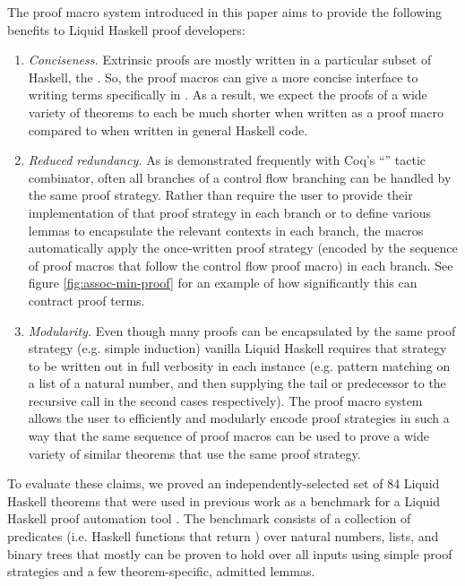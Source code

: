 The proof macro system introduced in this paper aims to provide the following
benefits to Liquid Haskell proof developers:
\begin{enumerate}
  \item \textit{Conciseness.} Extrinsic proofs are mostly written in a
  particular subset of Haskell, the \LangB. So, the proof macros can give a more
  concise interface to writing terms specifically in \LangB. As a result, we
  expect the proofs of a wide variety of theorems to each be much shorter when
  written as a proof macro compared to when written in general Haskell code.
  \item \textit{Reduced redundancy.} As is demonstrated frequently with Coq's
  ``\LC{;}'' tactic combinator, often all branches of a control flow branching
  can be handled by the same proof strategy. Rather than require the user to
  provide their implementation of that proof strategy in each branch or to
  define various lemmas to encapsulate the relevant contexts in each branch, the
  macros automatically apply the once-written proof strategy (encoded by the
  sequence of proof macros that follow the control flow proof macro) in each
  branch. See figure \ref{fig:assoc-min-proof} for an example of how
  significantly this can contract proof terms.
  \item \textit{Modularity.} Even though many proofs can be encapsulated by the
  same proof strategy (e.g. simple induction) vanilla Liquid Haskell requires
  that strategy to be written out in full verbosity in each instance (e.g.
  pattern matching on a list of a natural number, and then supplying the tail or
  predecessor to the recursive call in the second cases respectively). The proof
  macro system allows the user to efficiently and modularly encode proof
  strategies in such a way that the same sequence of proof macros can be used to
  prove a wide variety of similar theorems that use the same proof strategy.
\end{enumerate}

To evaluate these claims, we proved an independently-selected set of 84 Liquid
Haskell theorems that were used in previous work as a benchmark for a Liquid
Haskell proof automation tool . The benchmark consists of a
collection of predicates (i.e. Haskell functions that return ) over
natural numbers, lists, and binary trees that mostly can be proven to hold over
all inputs using simple proof strategies and a few theorem-specific, admitted
lemmas.

